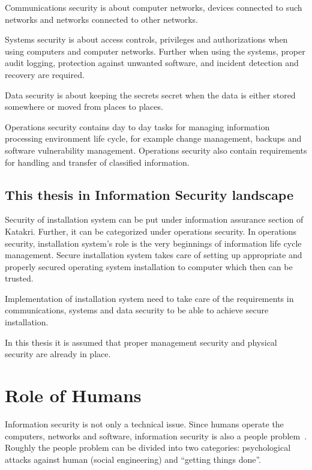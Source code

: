 Communications security is about computer networks, devices connected
to such networks and networks connected to other networks.

Systems security is about access controls, privileges and
authorizations when using computers and computer networks. Further
when using the systems, proper audit logging, protection against
unwanted software, and incident detection and recovery are required.

Data security is about keeping the secrets secret when the data is
either stored somewhere or moved from places to places.

Operations security contains day to day tasks for managing information
processing environment life cycle, for example change management,
backups and software vulnerability management. Operations security
also contain requirements for handling and transfer of classified
information.


\subsection{This thesis in Information Security landscape}

Security of installation system can be put under information assurance
section of Katakri. Further, it can be categorized under operations
security. In operations security, installation system's role is the
very beginnings of information life cycle management. Secure
installation system takes care of setting up appropriate and properly
secured operating system installation to computer which then can be
trusted.

Implementation of installation system need to take care of the
requirements in communications, systems and data security to be able
to achieve secure installation.

In this thesis it is assumed that proper management security and
physical security are already in place.


\section{Role of Humans}

Information security is not only a technical issue. Since humans
operate the computers, networks and software, information security is
also a people problem~\cite{parsons2010human}\cite{anderson}. Roughly
the people problem can be divided into two categories: psychological
attacks against human (social engineering) and ``getting things
done''.

